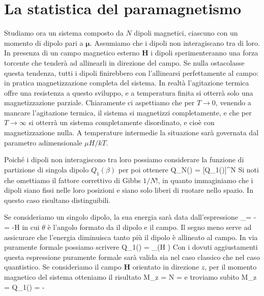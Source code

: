 \section{La statistica del paramagnetismo}

Studiamo ora un sistema composto da $N$ dipoli magnetici, ciascuno con un momento di dipolo pari a $\pmb{\mu}$. Assumiamo che i dipoli non interagiscano tra di loro. In presenza di un campo magnetico esterno $\mathbf{H}$ i dipoli sperimenteranno una forza torcente che tenderà ad allinearli in direzione del campo. Se nulla ostacolasse questa tendenza, tutti i dipoli finirebbero con l'allinearsi perfettamente al campo: in pratica magnetizzazione completa del sistema. In realtà l'agitazione termica offre una resistenza a questo sviluppo, e a temperatura finita si otterrà solo una magnetizzazione parziale. Chiaramente ci aspettiamo che per $T\to 0$, venendo a mancare l'agitazione termica, il sistema si magnetizzi completamente, e che per $T\to\infty$ si otterrà un sistema completamente disordinato, e cioè con magnetizzazione nulla. A temperature intermedie la situazione sarà governata dal parametro adimensionale $\mu H/kT$.

Poiché i dipoli non interagiscono tra loro possiamo considerare la funzione di partizione di singola dipolo $Q_1(\beta)$ per poi ottenere
\be
Q_N(\beta) = [Q_1(\beta)]^N
\ee
Si noti che omettiamo il fattore correttivo di Gibbs $1/N!$, in quanto immaginiamo che i dipoli siano fissi nelle loro posizioni e siano solo liberi di ruotare nello spazio. In questo caso risultano distinguibili. 

Se consideriamo un singolo dipolo, la sua energia sarà data dall'espressione
\be
\epsilon_\theta = -\pmb{\mu}\cdot{} = -\mu H\cos\theta
\ee
in cui $\theta$ è l'angolo formato da il dipolo e il campo. Il segno meno serve ad assicurare che l'energia diminuisca tanto più il dipolo è allineato al campo. In via puramente formale possiamo scrivere
\be
Q_1(\beta) = \sum_\theta\exp(\beta\mu H \cos\theta)
\ee
Con i dovuti aggiustamenti questa espressione puramente formale sarà valida sia nel caso classico che nel caso quantistico. Se consideriamo il campo $\mathbf{H}$ orientato in direzione $z$, per il momento magnetico del sistema otteniamo il risultato
\be
M_z = N\aspetta{\mu\cos\theta} = 
\ee
e troviamo subito
\be
M_z = \ln Q_1(\beta) = -
\ee


